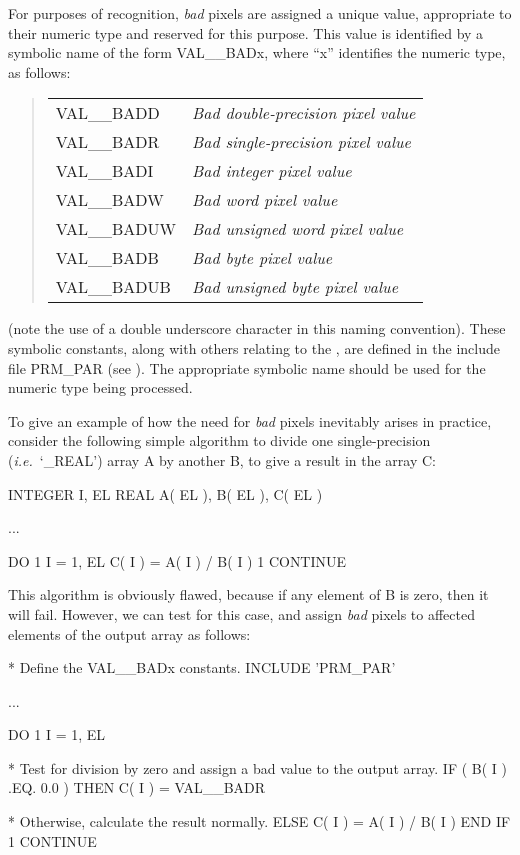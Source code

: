 \documentclass[twoside,11pt,nolof]{starlink}
\providecommand{\st}[1]{{\emph{#1}}}
\begin{document}
For purposes of recognition, \st{bad\/} pixels are assigned a unique value,
appropriate to their numeric type and reserved for this purpose.
This value is identified by a symbolic name of the form VAL\_\_BADx, where
``x'' identifies the numeric type, as follows:

\small
\begin{quote}
\begin{center}
\begin{tabular}{l@{ --- }l}
VAL\_\_BADD & \st{Bad double-precision pixel value}\\
VAL\_\_BADR & \st{Bad single-precision pixel value}\\
VAL\_\_BADI & \st{Bad integer pixel value}\\
VAL\_\_BADW & \st{Bad word pixel value}\\
VAL\_\_BADUW & \st{Bad unsigned word pixel value}\\
VAL\_\_BADB & \st{Bad byte pixel value}\\
VAL\_\_BADUB & \st{Bad unsigned byte pixel value}
\end{tabular}
\end{center}
\end{quote}
\normalsize

(note the use of a double underscore character in this naming convention).
These symbolic constants, along with others relating to the , are defined
in the include file PRM\_PAR (see ).
The appropriate symbolic name should be used for the numeric type being
processed.


To give an example of how the need for \st{bad\/} pixels inevitably arises in
practice, consider the following simple algorithm to divide one
single-precision (\st{i.e.}\ `\_REAL') array A by another B, to give a result
in the array C:

\small
\begin{terminalv}
      INTEGER I, EL
      REAL A( EL ), B( EL ), C( EL )

      ...

      DO 1 I = 1, EL
         C( I ) = A( I ) / B( I )
 1    CONTINUE
\end{terminalv}
\normalsize

This algorithm is obviously flawed, because if any element of B is zero,
then it will fail.
However, we can test for this case, and assign \st{bad\/} pixels to affected
elements of the output array as follows:

\small
\begin{terminalv}
*  Define the VAL__BADx constants.
      INCLUDE 'PRM_PAR'

      ...

      DO 1 I = 1, EL

*  Test for division by zero and assign a bad value to the output array.
         IF ( B( I ) .EQ. 0.0 ) THEN
            C( I ) = VAL__BADR

*  Otherwise, calculate the result normally.
         ELSE
            C( I ) = A( I ) / B( I )
         END IF
 1    CONTINUE
\end{terminalv}
\normalsize
\end{document}
